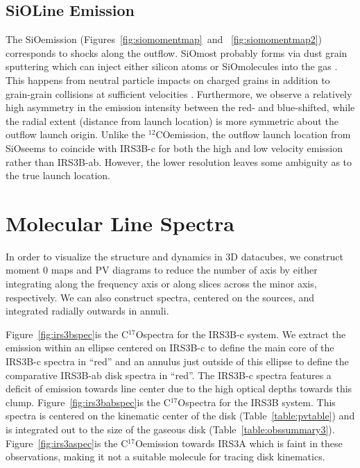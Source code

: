 \documentclass[twocolumn, 12pt]{aastex63}
\newcommand{\cso}{C$^{17}$O}
\newcommand{\co}{$^{12}$CO}
\newcommand{\sio}{SiO}
\begin{document}
\subsection{\sio\space Line Emission}\label{sec:sioemission}
The \sio\space emission (Figures~\ref{fig:siomomentmap}\space~and~ \ref{fig:siomomentmap2}) corresponds to shocks along the outflow. \sio\space most probably forms via dust grain sputtering which can inject either silicon atoms or \sio\space molecules into the gas \citep[][]{1997AA...322..296C}. This happens from neutral particle impacts on charged grains in addition to grain-grain collisions at sufficient velocities \citep[25-35~km~$s^{-1}$;][]{1997AA...322..296C}. Furthermore, we observe a relatively high asymmetry in the emission intensity between the red- and blue-shifted, while the radial extent (distance from launch location) is more symmetric about the outflow launch origin. Unlike the \co\space emission, the outflow launch location from \sio\space seems to coincide with IRS3B-c for both the high and low velocity emission rather than IRS3B-ab. However, the lower resolution leaves some ambiguity as to the true launch location.

\section{Molecular Line Spectra}\label{sec:spectra}
In order to visualize the structure and dynamics in 3D datacubes,  we construct moment 0 maps and PV diagrams to reduce the number of axis by either integrating along the frequency axis or along slices across the minor axis, respectively. We can also construct spectra, centered on the sources, and integrated radially outwards in annuli.

Figure~\ref{fig:irs3bspec}\space is the \cso\space spectra for the IRS3B-c system. We extract the emission within an ellipse centered on IRS3B-c to define the main core of the IRS3B-c spectra in ``red'' and an annulus just outside of this ellipse to define the comparative IRS3B-ab disk spectra in ``red''. The IRS3B-c spectra features a deficit of emission towards line center due to the high optical depths towards this clump. Figure~\ref{fig:irs3babspec}\space is the \cso\space spectra for the IRS3B system. This spectra is centered on the kinematic center of the disk (Table~\ref{table:pvtable}) and is integrated out to the size of the gaseous disk (Table~\ref{table:obssummary3}). Figure~\ref{fig:irs3aspec}\space is the \cso\space emission towards IRS3A which is faint in these observations, making it not a suitable molecule for tracing disk kinematics.
\end{document}
